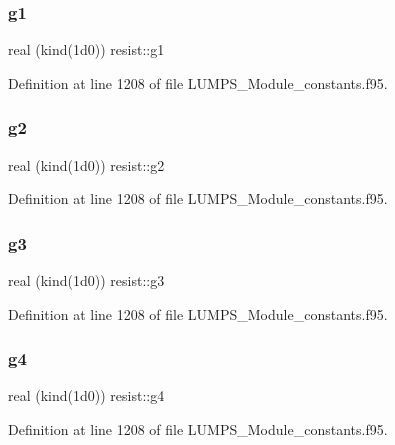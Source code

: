 \subsubsection{\texorpdfstring{g1}{g1}}
{\footnotesize\ttfamily real (kind(1d0)) resist\+::g1}



Definition at line 1208 of file L\+U\+M\+P\+S\+\_\+\+Module\+\_\+constants.\+f95.

\mbox{\label{namespaceresist_a98bae857808870e126fd947cdb3b9b14}} 
\subsubsection{\texorpdfstring{g2}{g2}}
{\footnotesize\ttfamily real (kind(1d0)) resist\+::g2}



Definition at line 1208 of file L\+U\+M\+P\+S\+\_\+\+Module\+\_\+constants.\+f95.

\mbox{\label{namespaceresist_a35b3f7080e2cc3d5883dbd59f8cfb21b}} 
\subsubsection{\texorpdfstring{g3}{g3}}
{\footnotesize\ttfamily real (kind(1d0)) resist\+::g3}



Definition at line 1208 of file L\+U\+M\+P\+S\+\_\+\+Module\+\_\+constants.\+f95.

\mbox{\label{namespaceresist_a9d34a5c68ab32cd207e570225330120b}} 
\subsubsection{\texorpdfstring{g4}{g4}}
{\footnotesize\ttfamily real (kind(1d0)) resist\+::g4}



Definition at line 1208 of file L\+U\+M\+P\+S\+\_\+\+Module\+\_\+constants.\+f95.

\mbox{\label{namespaceresist_aca3b131857592b71ec28cce48a2fb0ee}} 

